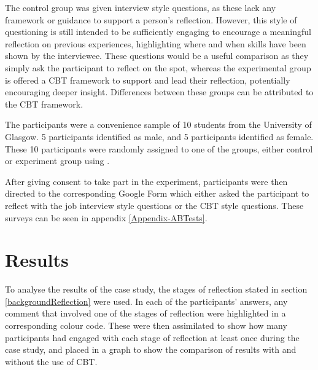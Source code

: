 \documentclass{l4proj}
\begin{document}
The control group was given interview style questions, as these lack any framework or guidance to support a person's reflection. However, this style of questioning is still intended to be sufficiently engaging to encourage a meaningful reflection on previous experiences, highlighting where and when skills have been shown by the interviewee. These questions would be a useful comparison as they simply ask the participant to reflect on the spot, whereas the experimental group is offered a CBT framework to support and lead their reflection, potentially encouraging deeper insight. Differences between these groups can be attributed to the CBT framework. 

The participants were a convenience sample of 10 students from the University of Glasgow. 5 participants identified as male, and 5 participants identified as female. These 10 participants were randomly assigned to one of the groups, either control or experiment group using \citet{random_lists_random_2013}.

After giving consent to take part in the experiment, participants were then directed to the corresponding Google Form which either asked the participant to reflect with the job interview style questions or the CBT style questions. These surveys can be seen in appendix \ref{Appendix-ABTests}.

\section{Results}

To analyse the results of the case study, the stages of reflection stated in section \ref{backgroundReflection} were used. In each of the participants' answers, any comment that involved one of the stages of reflection were highlighted in a corresponding colour code. These were then assimilated to show how many participants had engaged with each stage of reflection at least once during the case study, and placed in a graph to show the comparison of results with and without the use of CBT.
\end{document}
